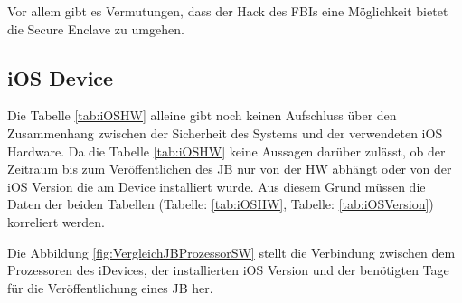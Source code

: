 Vor allem gibt es Vermutungen, dass der Hack des FBIs eine Möglichkeit bietet die Secure Enclave zu umgehen.

\subsection{iOS Device}
\label{sec:Frage1iOSDevice} 

Die Tabelle \ref{tab:iOSHW} alleine gibt noch keinen Aufschluss über den Zusammenhang zwischen der Sicherheit des Systems und der verwendeten iOS Hardware. Da die Tabelle \ref{tab:iOSHW} keine Aussagen darüber zulässt, ob der Zeitraum bis zum Veröffentlichen des JB nur von der HW abhängt oder von der iOS Version die am Device installiert wurde. Aus diesem Grund müssen die Daten der beiden Tabellen (Tabelle: \ref{tab:iOSHW}, Tabelle: \ref{tab:iOSVersion}) korreliert werden. \par 
Die Abbildung \ref{fig:VergleichJBProzessorSW} stellt die Verbindung zwischen dem Prozessoren des iDevices, der installierten iOS Version und der benötigten Tage für die Veröffentlichung eines JB her. \par


